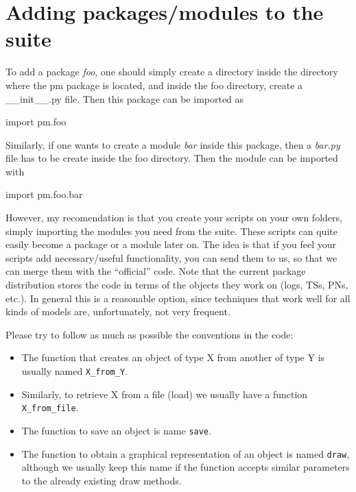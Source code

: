 \documentclass[a4paper,10pt]{book}
\begin{document}
\chapter{Adding packages/modules to the suite}

To add a package \emph{foo}, one should simply create a directory inside the directory where the pm package is located, and inside the foo directory, create a \_\_init\_\_.py file. Then this package can be imported as\\
\begin{pycode}
import pm.foo
\end{pycode}

Similarly, if one wants to create a module \emph{bar} inside this package, then a \emph{bar.py} file has to be create inside the foo directory. Then the module can be imported with\\
\begin{pycode}
import pm.foo.bar
\end{pycode}

However, my recomendation is that you create your scripts on your own folders, simply importing the modules you need from the suite. These scripts can quite easily become a package or a module later on. The idea is that if you feel your scripts add necessary/useful functionality, you can send them to us, so that we can merge them with the ``official'' code. Note that the current package distribution stores the code in terms of the objects they work on (logs, TSs, PNs, etc.). In general this is a reasonable option, since techniques that work well for all kinds of models are, unfortunately, not very frequent.

Please try to follow as much as possible the conventions in the code:
\begin{itemize}
 \item The function that creates an object of type X from another of type Y is usually named \texttt{X\_from\_Y}.
 \item Similarly, to retrieve X from a file (load) we usually have a function \texttt{X\_from\_file}.
 \item The function to save an object is name \texttt{save}.
 \item The function to obtain a graphical representation of an object is named \texttt{draw}, although we usually keep this name if the function accepts similar parameters to the already existing draw methods.
\end{itemize}



 
\end{document}
